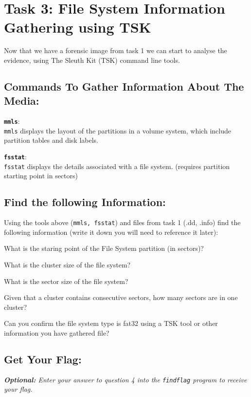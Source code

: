 \documentclass[a4paper,11pt]{article}
\begin{document}
\section{Task 3: File System Information Gathering using TSK}\label{sec:task3-fs-info-gathering}
Now that we have a forensic image from task 1 we can start to analyse the evidence, using The Sleuth Kit (TSK) command line tools.

\subsection*{Commands To Gather Information About The Media:}
\begin{itemize*}
	\item \textbf{\texttt{mmls}}:\\ \texttt{mmls} displays the layout of the partitions in a volume system, which include partition tables and disk labels.
	\item \textbf{\texttt{fsstat}}:\\ \texttt{fsstat} displays the details associated with a file system. (requires partition starting point in sectors)
\end{itemize*}

\subsection*{Find the following Information:}
Using the tools above (\texttt{mmls, fsstat}) and files from task 1 (.dd, .info) find the following information (write it down you will need to reference it later):
\begin{enumerate*}
	\item What is the staring point of the File System partition (in sectors)?
	\item What is the cluster size of the file system?
	\item What is the sector size of the file system?
	\item Given that a cluster contains consecutive sectors, how many sectors are in one cluster?
	\item Can you confirm the file system type is fat32 using a TSK tool or other information you have gathered file?
\end{enumerate*}

\subsection*{Get Your Flag:}
\noindent
\textit{\textbf{Optional:} Enter your answer to question 4 into the \texttt{findflag} program to receive your flag.}
\end{document}
